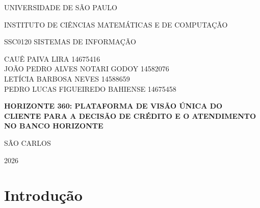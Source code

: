 \documentclass[12pt,a4paper]{article}
\begin{document}
\begin{titlepage}
\begin{center}

{\large UNIVERSIDADE DE S\~AO PAULO\par}
\vspace{0.2cm}
{\large INSTITUTO DE CI\^ENCIAS MATEM\'ATICAS E DE COMPUTA\c{C}\~AO\par}
\vspace{0.2cm}
{\normalsize SSC0120 \textemdash{} SISTEMAS DE INFORMA\c{C}\~AO\par}

\vfill

{\normalsize
CAU\^E PAIVA LIRA \textemdash{} 14675416\\[4pt]
JO\~AO PEDRO ALVES NOTARI GODOY \textemdash{} 14582076\\[4pt]
LET\'ICIA BARBOSA NEVES \textemdash{} 14588659\\[4pt]
PEDRO LUCAS FIGUEIREDO BAHIENSE \textemdash{} 14675458\par}

\vfill

{\large\bfseries HORIZONTE 360: PLATAFORMA DE VIS\~AO \'UNICA DO CLIENTE PARA A DECIS\~AO DE CR\'EDITO E O ATENDIMENTO NO BANCO HORIZONTE\par}

\vfill
\vfill

{\normalsize S\~AO CARLOS\par}
\vspace{0.2cm}
{\normalsize 2026\par}

\end{center}
\end{titlepage}

\clearpage
\tableofcontents
\thispagestyle{empty}
\clearpage

\setcounter{page}{1}

\section{Introdu\c{c}\~ao}
\end{document}
